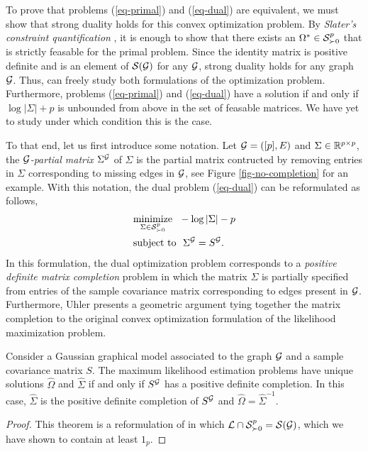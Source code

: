 To prove that problems (\ref{eq-primal}) and (\ref{eq-dual}) are equivalent, we must show that strong duality holds for this convex optimization problem. By \textit{Slater's constraint quantification} \cite[Section 5.3.2]{boyd2004convex}, it is enough to show that there exists an $\Omega^* \in \S^p_{\succ 0}$ that is strictly feasable for the primal problem. Since the identity matrix is positive definite and is an element of $\S(\G)$ for any $\G$, strong duality holds for any graph $\G$. Thus, can freely study both formulations of the optimization problem. Furthermore, problems (\ref{eq-primal}) and (\ref{eq-dual}) have a solution if and only if $\log |\Sigma| + p$ is unbounded from above in the set of feasable matrices. We have yet to study under which condition this is the case.

To that end, let us first introduce some notation. Let $\G = ([p], E)$ and $\Sigma \in \R^{p\times p}$, the \textit{$\G$-partial matrix} $\Sigma^\G$ of $\Sigma$ is the partial matrix contructed by removing entries in $\Sigma$ corresponding to missing edges in $\G$, see Figure \ref{fig-no-completion} for an example. With this notation, the dual problem (\ref{eq-dual}) can be reformulated as follows,
\begin{align} \label{eq-completion}
    \begin{split}    
        &\underset{\Sigma \in \S^p_{\succ 0}}{\t{minimize}}\ \  -\log |\Sigma| - p\\
        &\t{subject to}\ \ \Sigma^\G = S^\G.
    \end{split}
\end{align}
In this formulation, the dual optimization problem corresponds to a \textit{positive definite matrix completion} problem in which the matrix $\Sigma$ is partially specified from entries of the sample covariance matrix corresponding to edges present in $\G$. Furthermore, Uhler \cite[Section 9.4]{maathuis2018handbook} presents a geometric argument tying together the matrix completion to the original convex optimization formulation of the likelihood maximization problem.

\begin{theorem}
    Consider a Gaussian graphical model associated to the graph $\G$ and a sample covariance matrix $S$. The maximum likelihood estimation problems have unique solutions $\hat\Omega$ and $\hat\Sigma$ if and only if $S^\G$ has a positive definite completion. In this case, $\hat\Sigma$ is the positive definite completion of $S^\G$ and $\hat\Omega = \hat\Sigma^{-1}$.
\end{theorem}
\begin{proof}
    This theorem is a reformulation of \cite[Theorem 9.4.2]{maathuis2018handbook} in which $\c{L} \cap \S^p_{\succ 0} = \S(\G)$, which we have shown to contain at least $1_p$.
\end{proof}

